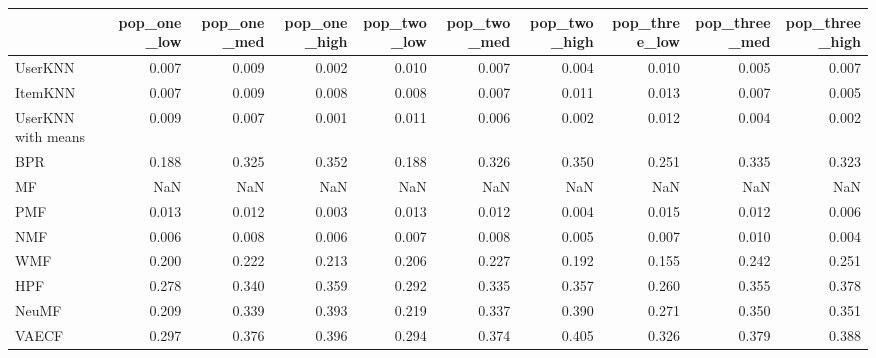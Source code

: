 \begin{tabular}{lrrrrrrrrr}
\toprule
{} &  pop\_one\_low &  pop\_one\_med &  pop\_one\_high &  pop\_two\_low &  pop\_two\_med &  pop\_two\_high &  pop\_three\_low &  pop\_three\_med &  pop\_three\_high \\
\midrule
UserKNN            &        0.007 &        0.009 &         0.002 &        0.010 &        0.007 &         0.004 &          0.010 &          0.005 &           0.007 \\
ItemKNN            &        0.007 &        0.009 &         0.008 &        0.008 &        0.007 &         0.011 &          0.013 &          0.007 &           0.005 \\
UserKNN with means &        0.009 &        0.007 &         0.001 &        0.011 &        0.006 &         0.002 &          0.012 &          0.004 &           0.002 \\
BPR                &        0.188 &        0.325 &         0.352 &        0.188 &        0.326 &         0.350 &          0.251 &          0.335 &           0.323 \\
MF                 &          NaN &          NaN &           NaN &          NaN &          NaN &           NaN &            NaN &            NaN &             NaN \\
PMF                &        0.013 &        0.012 &         0.003 &        0.013 &        0.012 &         0.004 &          0.015 &          0.012 &           0.006 \\
NMF                &        0.006 &        0.008 &         0.006 &        0.007 &        0.008 &         0.005 &          0.007 &          0.010 &           0.004 \\
WMF                &        0.200 &        0.222 &         0.213 &        0.206 &        0.227 &         0.192 &          0.155 &          0.242 &           0.251 \\
HPF                &        0.278 &        0.340 &         0.359 &        0.292 &        0.335 &         0.357 &          0.260 &          0.355 &           0.378 \\
NeuMF              &        0.209 &        0.339 &         0.393 &        0.219 &        0.337 &         0.390 &          0.271 &          0.350 &           0.351 \\
VAECF              &        0.297 &        0.376 &         0.396 &        0.294 &        0.374 &         0.405 &          0.326 &          0.379 &           0.388 \\
\bottomrule
\end{tabular}
